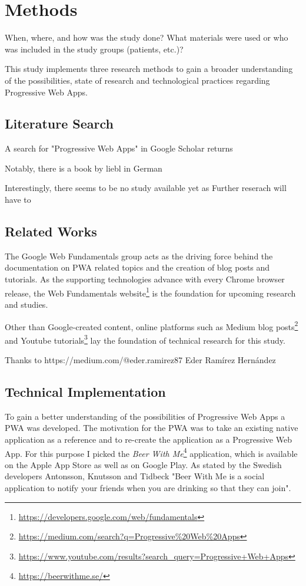 \chapter{Methods}
When, where, and how was the study done? What materials were used or who was included in the study groups (patients, etc.)?

This study implements three research methods to gain a broader understanding of the possibilities, state of research and technological practices regarding Progressive Web Apps.

\section{Literature Search}

A search for "Progressive Web Apps" in Google Scholar returns

Notably, there is a book by liebl in German

Interestingly, there seems to be no study available yet as
Further reserach will have to


\section{Related Works}
The Google Web Fundamentals group acts as the driving force behind the documentation on PWA related topics and the creation of blog posts and tutorials. As the supporting technologies advance with every Chrome browser release, the Web Fundamentals website\footnote{\url{https://developers.google.com/web/fundamentals}} is the foundation for upcoming research and studies.

Other than Google-created content, online platforms such as Medium blog posts\footnote{\url{https://medium.com/search?q=Progressive\%20Web\%20Apps}} and Youtube tutorials\footnote{\url{https://www.youtube.com/results?search_query=Progressive+Web+Apps}} lay the foundation of technical research for this study.

Thanks to https://medium.com/@eder.ramirez87 Eder Ramírez Hernández

\section{Technical Implementation}
To gain a better understanding of the possibilities of Progressive Web Apps a PWA was developed. The motivation for the PWA was to take an existing native application as a reference and to re-create the application as a Progressive Web App. For this purpose I picked the \textit{Beer With Me}\footnote{\url{https://beerwithme.se/}} application, which is available on the Apple App Store as well as on Google Play. As stated by the Swedish developers Antonsson, Knutsson and Tidbeck "Beer With Me is a social application to notify your friends when you are drinking so that they can join".
